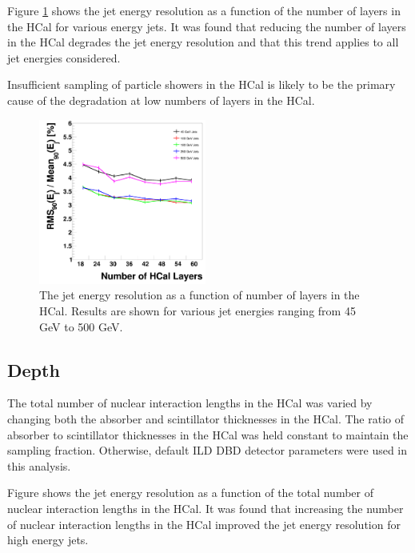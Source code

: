 \documentclass[final,3p,times,twocolumn]{elsarticle}
\begin{document}
Figure \ref{HCalLayers} shows the jet energy resolution as a function of the number of layers in the HCal for various energy jets.  It was found that reducing the number of layers in the HCal degrades the jet energy resolution and that this trend applies to all jet energies considered.  

Insufficient sampling of particle showers in the HCal is likely to be the primary cause of the degradation at low numbers of layers in the HCal.

\begin{figure}[!h]
  \begin{center}
     \includegraphics[width=0.49\textwidth]{JERvsHCalNumLayersHCalTC10ns.png}
     \caption{The jet energy resolution as a function of number of layers in the HCal.  Results are shown for various jet energies ranging from 45 GeV to 500 GeV.\label{HCalLayers}}
  \end{center}
\end{figure}


\subsection{Depth}
The total number of nuclear interaction lengths in the HCal was varied by changing both the absorber and scintillator thicknesses in the HCal.  The ratio of absorber to scintillator thicknesses in the HCal was held constant to maintain the sampling fraction.  Otherwise, default ILD DBD detector parameters were used in this analysis.

Figure \label{HCalDepth} shows the jet energy resolution as a function of the total number of nuclear interaction lengths in the HCal.  It was found that increasing the number of nuclear interaction lengths in the HCal improved the jet energy resolution for high energy jets.  
\end{document}
